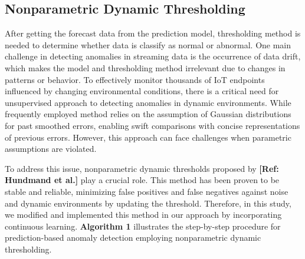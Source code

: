 \documentclass[final,3p,times,twocolumn]{elsarticle}
\begin{document}
\subsection{Nonparametric Dynamic Thresholding}

After getting the forecast data from the prediction model, thresholding method is needed to determine whether data is classify as normal or abnormal. One main challenge in detecting anomalies in streaming data is the occurrence of data drift, which makes the model and thresholding method irrelevant due to changes in patterns or behavior. To effectively monitor thousands of IoT endpoints influenced by changing environmental conditions, there is a critical need for unsupervised approach to detecting anomalies in dynamic environments. While frequently employed method relies on the assumption of Gaussian distributions for past smoothed errors, enabling swift comparisons with concise representations of previous errors. However, this approach can face challenges when parametric assumptions are violated.

To address this issue, nonparametric dynamic thresholds proposed by \textbf{[Ref: Hundmand et al.]} play a crucial role. This method has been proven to be stable and reliable, minimizing false positives and false negatives against noise and dynamic environments by updating the threshold. Therefore, in this study, we modified and implemented this method in our approach by incorporating continuous learning. \textbf{Algorithm 1} illustrates the step-by-step procedure for prediction-based anomaly detection employing nonparametric dynamic thresholding.
\end{document}
